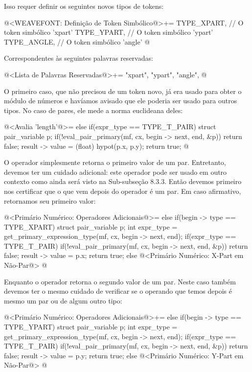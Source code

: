 Isso requer definir os seguintes novos tipos de tokens:

\iniciocodigo
@<WEAVEFONT: Definição de Token Simbólico@>+=
TYPE_XPART,  // O token simbólico 'xpart'
TYPE_YPART,  // O token simbólico 'ypart'
TYPE_ANGLE,  // O token simbólico 'angle'
@
\fimcodigo

Correspondentes às seguintes palavras reservadas:

\iniciocodigo
@<Lista de Palavras Reservadas@>+=
"xpart", "ypart", "angle",
@
\fimcodigo

O primeiro caso, que não precisou de um token
novo,  já era usado para obter o módulo de números
e havíamos avisado que ele poderia ser usado para outros tipos. No
caso de pares, ele mede a norma euclideana deles:

\iniciocodigo
@<Avalia 'length'@>=
else if(expr_type == TYPE_T_PAIR){
  struct pair_variable p;
  if(!eval_pair_primary(mf, cx, begin -> next, end, &p))
    return false;
  result -> value = (float) hypot(p.x, p.y);
  return true;
}
@
\fimcodigo

O operador  simplesmente retorna o primeiro valor de
um par. Entretanto, devemos ter um cuidado adicional: este operador
pode ser usado em outro contexto como ainda será visto na Sub-subseção
8.3.3. Então devemos primeiro nos certificar que o que vem depois do
operador é um par. Em caso afirmativo, retornamos seu primeiro valor:

\iniciocodigo
@<Primário Numérico: Operadores Adicionais@>=
else if(begin -> type == TYPE_XPART){
  struct pair_variable p;
  int expr_type = get_primary_expression_type(mf, cx, begin -> next, end);
  if(expr_type == TYPE_T_PAIR){
    if(!eval_pair_primary(mf, cx, begin -> next, end, &p))
      return false;
    result -> value = p.x;
    return true;
  }
  else{
    @<Primário Numérico: X-Part em Não-Par@>
  }
}
@
\fimcodigo

Enquanto o operador  retorna o segundo valor de um
par. Neste caso também devemos ter o mesmo cuidado de verificar se o
operando que temos depois é mesmo um par ou de algum outro tipo:

\iniciocodigo
@<Primário Numérico: Operadores Adicionais@>+=
else if(begin -> type == TYPE_YPART){
  struct pair_variable p;
  int expr_type = get_primary_expression_type(mf, cx, begin -> next, end);
  if(expr_type == TYPE_T_PAIR){
    if(!eval_pair_primary(mf, cx, begin -> next, end, &p))
      return false;
    result -> value = p.y;
    return true;
  }
  else{
    @<Primário Numérico: Y-Part em Não-Par@>
  }
}
@
\fimcodigo

